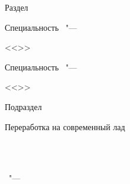 \begin{center}
\begingroup
  \renewcommand{\thesisTitleFormat}[2]{%
    \scalebox{1.65}{\large\MakeUppercase{#1}}\par
    \vspace{0.45\baselineskip}%
    \scalebox{3.4}{\large\bfseries\MakeUppercase{#2}}\par
  }
  \thesisTitle
\endgroup

\vspace{0pt plus2fill} %
\ifdefempty{\thesisSpecialtyNumber}
  {%
    {\small Раздел\par}
    {\Large\bfseries \MakeUppercase{\thesisSpecialtyTitle}\par}
  }
  {{\large Специальность \thesisSpecialtyNumber\ "---\par <<\thesisSpecialtyTitle>>\par}}
\ifdefined\thesisSpecialtyTwoNumber
  {\large Специальность \thesisSpecialtyTwoNumber\ "---\par <<\thesisSpecialtyTwoTitle>>\par}
\fi

\vspace{0pt plus2fill} %
{\small Подраздел\par}
{\large \MakeUppercase{\thesisDegreeShort}\par}
\smallskip
{\LARGE \MakeUppercase{\thesisDegree}\par}
\end{center}
%
\vspace{0pt plus4fill} %
\begin{flushright}
Переработка на современный лад\\
\ifdefined\supervisorDead
  \framebox{\supervisorFio}%
\else
  \supervisorFio
\fi\\
\supervisorRegalia
\ifdefined\supervisorTwoFio
  \par
  \ifdefined\supervisorTwoDead
    \framebox{\supervisorTwoFio}%
  \else
    \supervisorTwoFio
  \fi\\
  \supervisorTwoRegalia
\fi
\end{flushright}
%
\vspace{0pt plus4fill} %
{\centering\thesisCity\ "--- \thesisYear\par}
